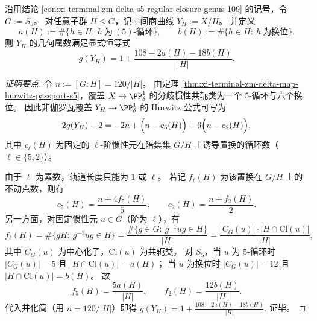 \begin{conclusion}\label{con:xi-terminal-zm-delta-s5-intermediate-genus-hurwitz-burnside}
沿用结论 \ref{con:xi-terminal-zm-delta-s5-regular-closure-genus-109} 的记号，令 \(G:=S_5\)。
对任意子群 \(H\le G\)，记中间商曲线 \(Y_H:=X/H\)。
并定义
\[
a(H):=\#\{h\in H:\ h\ \text{为}\ (5)\text{-循环}\},\qquad
b(H):=\#\{h\in H:\ h\ \text{为换位}\}.
\]
则 \(Y_H\) 的几何属数满足显式恒等式
\[
g(Y_H)=1+\frac{108-2a(H)-18b(H)}{|H|}.
\]
\end{conclusion}
\begin{proof}[证明要点]
令 \(n:=[G\!:\!H]=120/|H|\)。
由定理 \ref{thm:xi-terminal-zm-delta-map-hurwitz-passport-s5}，覆盖 \(X\to\PP^1_\delta\) 的分歧惯性共轭类为一个 \(5\)-循环与六个换位。
因此非伽罗瓦覆盖 \(Y_H\to\PP^1_\delta\) 的 Hurwitz 公式可写为
\[
2g(Y_H)-2=-2n+\Bigl(n-c_5(H)\Bigr)+6\Bigl(n-c_2(H)\Bigr),
\]
其中 \(c_\ell(H)\) 为固定的 \(\ell\)-阶惯性元在陪集集 \(G/H\) 上诱导置换的循环数（\(\ell\in\{5,2\}\)）。
\par
由于 \(\ell\) 为素数，轨道长度只能为 \(1\) 或 \(\ell\)。
若记 \(f_\ell(H)\) 为该置换在 \(G/H\) 上的不动点数，则有
\[
c_5(H)=\frac{n+4f_5(H)}5,\qquad
c_2(H)=\frac{n+f_2(H)}2.
\]
另一方面，对固定惯性元 \(u\in G\)（阶为 \(\ell\)），有
\[
f_\ell(H)=\#\{gH:\ g^{-1}ug\in H\}
      =\frac{\#\{g\in G:\ g^{-1}ug\in H\}}{|H|}
      =\frac{|C_G(u)|\cdot |H\cap \mathrm{Cl}(u)|}{|H|},
\]
其中 \(C_G(u)\) 为中心化子，\(\mathrm{Cl}(u)\) 为共轭类。
对 \(S_5\)，当 \(u\) 为 \(5\)-循环时 \(|C_G(u)|=5\) 且 \(|H\cap\mathrm{Cl}(u)|=a(H)\)；
当 \(u\) 为换位时 \(|C_G(u)|=12\) 且 \(|H\cap\mathrm{Cl}(u)|=b(H)\)。
故
\[
f_5(H)=\frac{5a(H)}{|H|},\qquad
f_2(H)=\frac{12b(H)}{|H|}.
\]
代入并化简（用 \(n=120/|H|\)）即得
\(
g(Y_H)=1+\frac{108-2a(H)-18b(H)}{|H|}.
\)
证毕。
\end{proof}

